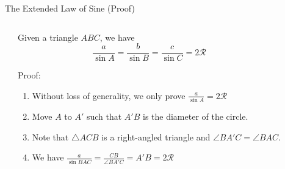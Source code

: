 \documentclass{beamer}
\begin{document}
\begin{frame}{The Extended Law of Sine (Proof)}
	\begin{columns}
			\begin{center}
			\end{center}
		\begin{center}
			\begin{minipage}{0.9\textwidth}
				\begin{theorem}
					Given a triangle $ABC$, we have 
					\begin{equation*}
						\frac{a}{\sin A} = \frac{b}{\sin B} = \frac{c}{\sin C} = 2\mathcal{R}
					\end{equation*}
				\end{theorem}
				Proof:
				\begin{enumerate}
					\item Without loss of generality, we only prove $\frac{a}{\sin A} = 2\mathcal{R}$
					\item<2-> Move $A$ to $A'$ such that $A'B$ is the diameter of the circle.
					\item<3-> Note that $\triangle ACB$ is a right-angled triangle and $\angle BA'C = \angle BAC$.
					\item<4-> We have $\frac{a}{\sin BAC} = \frac{CB}{\angle BA'C} = A'B = 2\mathcal{R}$
				\end{enumerate}
			\end{minipage}
		\end{center}
	\end{columns}	
\end{frame}
\end{document}
